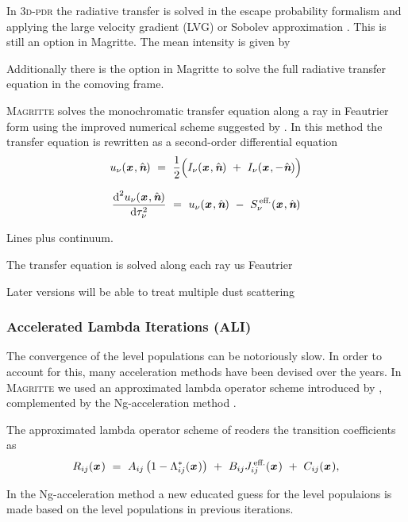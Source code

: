 \documentclass[a4paper,fleqn,usenatbib]{mnras}
\newcommand{\D}{\text{d}}
\newcommand{\x}{{\textit{\textbf{x}}}\,}
\newcommand{\n}{\hat{\textit{\textbf{n}}}}
\begin{document}
In \textsc{3d-pdr} the radiative transfer is solved in the escape probability formalism and applying the large velocity gradient (LVG) or Sobolev approximation \citep{Sobolev1960, Castor1970, deJong1975, Poelman2005}. This is still an option in Magritte. The mean intensity is given by


Additionally there is the option in Magritte to solve the full radiative transfer equation in the comoving frame.

\textsc{Magritte} solves the monochromatic transfer equation along a ray in Feautrier form \citep{Feautrier1964} using the improved numerical scheme suggested by \citet{Rybicki1991}. In this method the transfer equation is rewritten as a second-order differential equation
\begin{equation}
	u_{\nu}(\x, \n) \ = \ \frac{1}{2}\Big( I_{\nu}(\x, \n) \ + \ I_{\nu}(\x, -\n) \Big)
\end{equation}

\begin{equation}
	\frac{\D^{2}u_{\nu}(\x, \n)}{\D\tau_{\nu}^{2}} \ = \ u_{\nu}(\x, \n) \ - \ S_{\nu}^{\,\text{eff.}}(\x, \n)
\end{equation}

Lines plus continuum.


The transfer equation is solved along each ray us Feautrier

Later versions will be able to treat multiple dust scattering



\subsubsection{Accelerated Lambda Iterations (ALI)}

The convergence of the level populations can be notoriously slow. In order to account for this, many acceleration methods have been devised over the years. In \textsc{Magritte} we used an approximated lambda operator scheme introduced by \citet{Rybicki1991}, complemented by the Ng-acceleration method \citep{Ng1974}.

The approximated lambda operator scheme of \citeauthor{Rybicki1991} reoders the transition coefficients as
\begin{equation}
	R_{ij}(\x) \ = \ A_{ij} \left(1-\Lambda^{\ast}_{ij}(\x)\right) \ + \ B_{ij}  J^{\,\text{eff.}}_{ij}(\x) \ + \ C_{ij}(\x),
\label{RybickiHummer}
\end{equation}


In the Ng-acceleration method \citep{Ng1974} a new educated guess for the level populaions is made based on the level populations in previous iterations.
\end{document}
